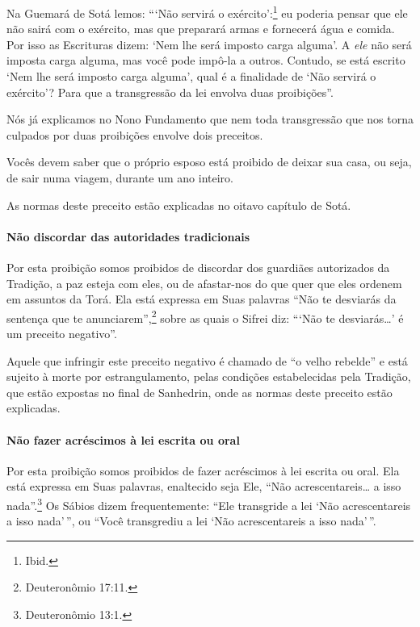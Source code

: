 Na Guemará de Sotá lemos: ```Não servirá o exército':\footnote{Ibid.} eu
poderia pensar que ele não sairá com o exército, mas que preparará armas
e fornecerá água e comida. Por isso as Escrituras dizem: `Nem lhe será
imposto carga alguma'. A \emph{ele} não será imposta carga alguma, mas
você pode impô-la a outros. Contudo, se está escrito `Nem lhe será
imposto carga alguma', qual é a finalidade de `Não servirá o exército'?
Para que a transgressão da lei envolva duas proibições''.

Nós já explicamos no Nono Fundamento que nem toda transgressão que nos
torna culpados por duas proibições envolve dois preceitos.

Vocês devem saber que o próprio esposo está proibido de deixar sua casa,
ou seja, de sair numa viagem, durante um ano inteiro.

As normas deste preceito estão explicadas no oitavo capítulo de Sotá.

\paragraph{Não discordar das autoridades tradicionais}

Por esta proibição somos proibidos de discordar dos guardiães
autorizados da Tradição, a paz esteja com eles, ou de afastar-nos do que
quer que eles ordenem em assuntos da Torá. Ela está expressa em Suas
palavras ``Não te desviarás da sentença que te anunciarem'',\footnote{Deuteronômio 17:11.} sobre as quais o Sifrei diz: ```Não te
desviarás\ldots{}' é um preceito negativo''.

Aquele que infringir este preceito negativo é chamado de ``o velho
rebelde'' e está sujeito à morte por estrangulamento, pelas condições
estabelecidas pela Tradição, que estão expostas no final de Sanhedrin,
onde as normas deste preceito estão explicadas.

\paragraph{Não fazer acréscimos à lei escrita ou oral}

Por esta proibição somos proibidos de fazer acréscimos à lei escrita ou
oral. Ela está expressa em Suas palavras, enaltecido seja Ele, ``Não
acrescentareis\ldots{} a isso nada''.\footnote{Deuteronômio 13:1.} Os Sábios dizem
frequentemente: ``Ele transgride a lei `Não acrescentareis a isso
nada'\,'', ou ``Você transgrediu a lei `Não acrescentareis a isso nada'\,''.

